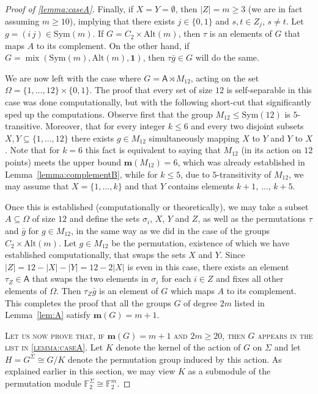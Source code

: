 \documentclass[a4paper]{amsart}
\newcommand{\Sym}{\mathrm{Sym}}
\newcommand{\Alt}{\mathrm{Alt}}
\newcommand{\FF}{\mathbb{F}}
\newcommand{\m}{\mathbf{m}}
\newcommand{\mix}{\mathop{\mathrm{mix}}}
\newcommand{\A}{\mathsf{A}}
\newcommand{\one}{\mathbf{1}}
\theoremstyle{definition}
\begin{document}
\begin{proof}[Proof of \cref{lemma:caseA}]
Finally, if 
 $X = Y = \emptyset$, then $|Z| = m \ge 3$ (we are in fact assuming $m\ge 10$),
implying that there exists $j\in \{0,1\}$ and $s,t \in Z_j$, $s\not = t$. Let $g=(i\, j) \in \Sym(m)$. If $G=C_2 \times \Alt(m)$,
then $\tau$ is an elements of $G$ that maps
$A$ to its complement. On the other hand,
if $G=\mix(\Sym(m),\Alt(m),\one)$, then
$\tau\bar{g} \in G$ will do the same.

We are now left with the case where
$G=\A \rtimes M_{12}$, acting on the set $\Omega = \{1,\ldots,12\} \times \{0,1\}$.
The proof that
every set of size $12$ is self-separable
in this case was done computationally,
but with the following short-cut that significantly
sped up the computations.
Observe first that the group $M_{12} \le \Sym(12)$ is $5$-transitive. Moreover,
that for every integer $k\le 6$ and every two
disjoint subsets $X, Y \subseteq \{1,\ldots,12\}$ there exists $g\in M_{12}$
simultaneously mapping $X$ to $Y$ and $Y$ to $X$.
Note that for $k=6$ this fact is equivalent
to saying that $M_{12}$ (in its action on $12$ points) meets the upper bound $\m(M_{12}) = 6$,
which was already established in Lemma~\ref{lemma:complementB},
while for $k\le 5$, due to $5$-transitivity of $M_{12}$, we may assume that $X=\{1,\ldots,k\}$
and that $Y$ contains elements $k+1$, $\dots$, $k+5$.

Once this is established (computationally or theoretically),
we may take a subset $A\subseteq \Omega$ of size $12$
and define the sets $\sigma_i$, $X$, $Y$ and $Z$, as well as the permutations $\tau$ and $\bar{g}$ for $g\in M_{12}$, in the same way as we did in the case of the groups $C_2\times \Alt(m)$. 
Let $g\in M_{12}$ be the permutation, existence
of which we have established computationally, that swaps the sets $X$ and $Y$.
Since $|Z| = 12 - |X| - |Y| = 12 - 2|X|$
is even in this case, there exists an element
$\tau_Z \in \A$ that swaps the two elements in $\sigma_i$
for each $i\in Z$ and fixes all other elements of $\Omega$. Then $\tau_Z\bar{g}$ is an element
of $G$ which maps $A$ to its complement.
This completes the proof that all the groups $G$ of degree $2m$
listed in Lemma~\ref{lem:A} satisfy $\m(G)=m+1$.

\smallskip
\noindent \textsc{Let us now prove that, if $\m(G) = m+1$ and $2m\ge 20$, then $G$ appears in the list in \cref{lemma:caseA}.}
 Let $K$ denote the kernel of the action of $G$ on $\Sigma$ and let $H = G^\Sigma \cong G/K$ denote the permutation group induced by this action. As explained earlier in this section, we may view $K$ as a submodule of the permutation module $\FF_2^\Sigma \cong \FF_2^m$.


\end{proof}
\end{document}
